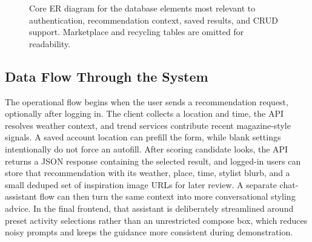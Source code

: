 \documentclass[11pt,a4paper]{article}
\begin{document}
\begin{figure}[H]
\centering
{}
\caption{Core ER diagram for the database elements most relevant to authentication, recommendation context, saved results, and CRUD support. Marketplace and recycling tables are omitted for readability.}
\label{fig:data}
\end{figure}

\subsection{Data Flow Through the System}
The operational flow begins when the user sends a recommendation request, optionally after logging in. The client collects a location and time, the API resolves weather context, and trend services contribute recent magazine-style signals. A saved account location can prefill the form, while blank settings intentionally do not force an autofill. After scoring candidate looks, the API returns a JSON response containing the selected result, and logged-in users can store that recommendation with its weather, place, time, stylist blurb, and a small deduped set of inspiration image URLs for later review. A separate chat-assistant flow can then turn the same context into more conversational styling advice. In the final frontend, that assistant is deliberately streamlined around preset activity selections rather than an unrestricted compose box, which reduces noisy prompts and keeps the guidance more consistent during demonstration.
\end{document}

